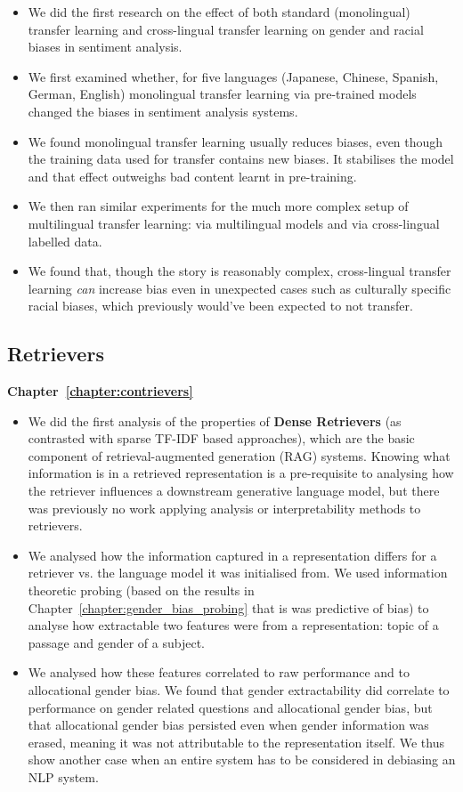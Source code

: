 \begin{itemize}
    \item We did the first research on the effect of both standard (monolingual) transfer learning and cross-lingual transfer learning on gender and racial biases in sentiment analysis.
    \item We first examined whether, for five languages (Japanese, Chinese, Spanish, German, English) monolingual transfer learning via pre-trained models changed the biases in sentiment analysis systems.
    \item  We found monolingual transfer learning usually reduces biases, even though the training data used for transfer contains new biases. It stabilises the model and that effect outweighs bad content learnt in pre-training. 
    \item  We then ran similar experiments for the much more complex setup of multilingual transfer learning: via multilingual models and via cross-lingual labelled data. 
    \item We found that, though the story is reasonably complex, cross-lingual transfer learning \textit{can} increase bias even in unexpected cases such as culturally specific racial biases, which previously would've been expected to not transfer.
\end{itemize}



\subsection{Retrievers}
\textbf{Chapter~\ref{chapter:contrievers}}

\begin{itemize}
    \item We did the first analysis of the properties of \textbf{Dense Retrievers} (as contrasted with sparse TF-IDF based approaches), which are the basic component of retrieval-augmented generation (RAG) systems. Knowing what information is in a retrieved representation is a pre-requisite to analysing how the retriever influences a downstream generative language model, but there was previously no work applying analysis or interpretability methods to retrievers.
    \item We analysed how the information captured in a representation differs for a retriever vs. the language model it was initialised from. We used information theoretic probing (based on the results in Chapter~\ref{chapter:gender_bias_probing} that is was predictive of bias) to analyse how extractable two features were from a representation: topic of a passage and gender of a subject. 
    \item We analysed how these features correlated to raw performance and to allocational gender bias. We found that gender extractability did correlate to performance on gender related questions and allocational gender bias, but that allocational gender bias persisted even when gender information was erased, meaning it was not attributable to the representation itself. We thus show another case when an entire system has to be considered in debiasing an NLP system.
\end{itemize}

